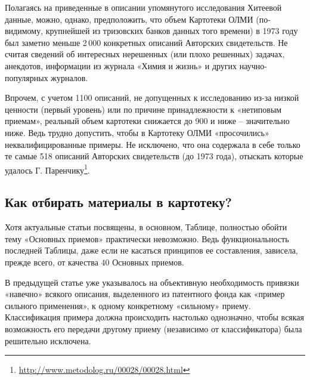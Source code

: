 \documentclass[11pt,a4paper]{article}
\begin{document}
Полагаясь на приведенные в описании упомянутого исследования Хитеевой данные,
можно, однако, предположить, что объем Картотеки ОЛМИ (по-видимому, крупнейшей
из тризовских банков данных того времени) в 1973 году был заметно меньше 2\,000
конкретных описаний Авторских свидетельств. Не считая сведений об интересных
нерешенных (или плохо решенных) задачах, анекдотов, информации из журнала
«Химия и жизнь» и других научно-популярных журналов.

Впрочем, с учетом 1100 описаний, не допущенных к исследованию из-за низкой
ценности (первый уровень) или по причине принадлежности к «нетиповым приемам»,
реальный объем картотеки снижается до 900 и ниже -- значительно ниже. Ведь
трудно допустить, чтобы в Картотеку ОЛМИ «просочились» неквалифицированные
примеры. Не исключено, что она содержала в себе только те самые 518 описаний
Авторских свидетельств (до 1973 года), отыскать которые удалось
Г. Паренчику\footnote{\url{http://www.metodolog.ru/00028/00028.html}}.

\subsection*{Как отбирать материалы в картотеку?}

Хотя актуальные статьи посвящены, в основном, Таблице, полностью обойти тему
«Основных приемов» практически невозможно. Ведь функциональность последней
Таблицы, даже если не касаться принципов ее составления, зависела, прежде
всего, от качества 40 Основных приемов.

В предыдущей статье уже указывалось на объективную необходимость привязки
«навечно» всякого описания, выделенного из патентного фонда как «пример
сильного применения», к одному конкретному «сильному» приему. Классификация
примера должна происходить настолько однозначно, чтобы всякая возможность его
передачи другому приему (независимо от классификатора) была решительно
исключена.
\end{document}
